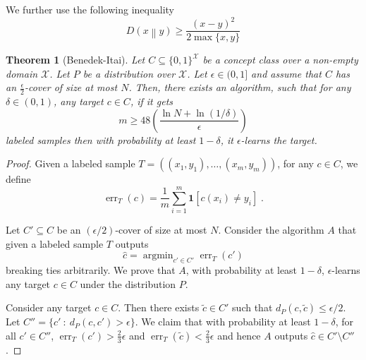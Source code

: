 \documentclass[11pt]{article}
\newtheorem{theorem}[proposition]{Theorem}
\newcommand{\X}{\mathcal{X}}
\newcommand{\indicator}[1]{\mathbf{1}\left[{#1}\right]}
\newcommand{\KL}[2]{D\left(#1 \middle\| #2 \right)}
\DeclareMathOperator*{\argmin}{argmin}
\DeclareMathOperator{\err}{err}
\begin{document}
We further use the following inequality
$$
\KL{x}{y} \ge \frac{(x-y)^2}{2 \max\{x, y\}}
$$


\begin{theorem}[Benedek-Itai]
\label{theorem:benedek-itai}
Let $C \subseteq \{0,1\}^\X$ be a concept class over a non-empty domain $\X$.
Let $P$ be a distribution over $\X$. Let $\epsilon \in (0,1]$ and assume that
$C$ has an $\frac{\epsilon}{2}$-cover of size at most $N$. Then, there exists an
algorithm, such that for any $\delta \in (0,1)$, any target $c \in C$, if it
gets
$$
m \ge 48\left(\frac{\ln N + \ln(1/\delta)}{\epsilon}\right)
$$
labeled samples then with probability at least $1 - \delta$, it
$\epsilon$-learns the target.
\end{theorem}

\begin{proof}
Given a labeled sample $T = ( (x_1, y_1), \dots, (x_m, y_m) )$, for any $c \in C$,
we define
$$
\err_T(c) = \frac{1}{m} \sum_{i=1}^m \indicator{c(x_i) \neq y_i} \; .
$$

Let $C' \subseteq C$ be an $(\epsilon/2)$-cover of size at most $N$.
Consider the algorithm $A$ that given a labeled sample $T$ outputs
$$
\widehat c = \argmin_{c' \in C'} \err_T(c')
$$
breaking ties arbitrarily. We prove that $A$, with probability at least
$1-\delta$, $\epsilon$-learns any target $c \in C$ under the distribution $P$.

Consider any target $c \in C$. Then there exists $\widetilde c \in C'$ such that
$d_P(c,\widetilde c) \le \epsilon/2$. Let $C'' = \{ c' ~:~ d_P(c,c') > \epsilon \}$.
We claim that with probability at least $1 - \delta$, for all $c' \in C''$,
$\err_T(c') > \frac{2}{3} \epsilon$ and $\err_T(\widetilde{c}) <
\frac{2}{3}\epsilon$ and hence $A$ outputs $\widehat c \in C' \setminus C''$.


\end{proof}
\end{document}

